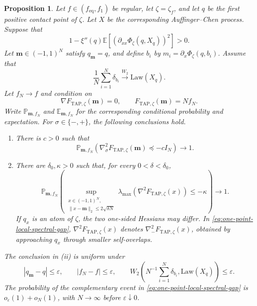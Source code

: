 \documentclass[a4paper,10pt,reqno]{amsart}
\numberwithin{equation}{section}
\newtheorem{proposition}{Proposition}[section]
\newcommand{\ve}{\varepsilon}
\newcommand{\dP}{\mathbb{P}}%
\newcommand{\dE}{\mathbb{E}}%
\newcommand{\Law}{\mathrm{Law}}
\newcommand{\TAP}{\mathrm{TAP}}
\newcommand{\eq}{\mathrm{eq}}
\newcommand{\bfm}{\mathbf{m}}
\begin{document}
	\begin{proposition}\label{prop:one-point-conditional-hessian}
		Let \(f\in(f_{\eq},f_1)\) be regular, let \(\zeta=\zeta_f\), and let
		\(q\) be the first positive contact point of \(\zeta\). Let \(X\) be the
		corresponding Auffinger--Chen process. Suppose that
		\[
		1-\xi''(q)\dE\left[
		\left(
		\partial_{xx}\Phi_\zeta(q,X_q)
		\right)^2
		\right]>0.
		\]
		Let \(\bfm\in (-1,1)^N\) satisfy \(q_\bfm=q\), and define \(b_i\) by
		\(m_i=\partial_x\Phi_\zeta(q,b_i)\). Assume that
		\[
		\frac1N\sum_{i=1}^N\delta_{b_i}
		\xrightarrow{W_2}\Law(X_q).
		\]
		Let \(f_N\to f\) and condition on
		\[
		\nabla F_{\TAP,\zeta}(\bfm)=0,
		\qquad
		F_{\TAP,\zeta}(\bfm)=Nf_N.
		\]
		Write \(\dP_{\bfm,f_N}\) and \(\dE_{\bfm,f_N}\) for the corresponding
		conditional probability and expectation. For
		\(\sigma\in\{-,+\}\), the following conclusions hold.
		\begin{enumerate}[label=\textup{(\roman*)}]
			\item There is \(c>0\) such that
			\begin{equation}
				\dP_{\bfm,f_N}\left(
				\nabla_\sigma^2F_{\TAP,\zeta}(\bfm)\preceq-cI_N
				\right)\longrightarrow1.
			\end{equation}
			
			\item
			\begingroup
			There are \(\delta_0,\kappa>0\) such that, for every
			\(0<\delta<\delta_0\),
			\begin{equation}\label{eq:one-point-local-spectral-gap}
				\dP_{\bfm,f_N}\left(
				\sup_{\substack{
						x\in(-1,1)^N,\\
						\|x-\bfm\|_2\le2\sqrt{\delta N}
				}}
				\lambda_{\max}\!\left(
				\nabla^2F_{\TAP,\zeta}(x)
				\right)
				\le-\kappa
				\right)\longrightarrow1.
			\end{equation}
			If \(q_x\) is an atom of \(\zeta\), the two one-sided Hessians may
			differ. In \eqref{eq:one-point-local-spectral-gap},
			\(\nabla^2F_{\TAP,\zeta}(x)\) denotes
			\(\nabla_-^2F_{\TAP,\zeta}(x)\), obtained by approaching \(q_x\)
			through smaller self-overlaps.
			\endgroup
		\end{enumerate}
		The conclusion in \textup{(ii)} is uniform under
		\[
		|q_\bfm-q|\le\ve,
		\qquad
		|f_N-f|\le\ve,
		\qquad
		W_2\left(N^{-1}\sum_{i=1}^N\delta_{b_i},\Law(X_q)\right)\le\ve.
		\]
		The probability of the complementary event in
		\eqref{eq:one-point-local-spectral-gap} is
		\(o_\ve(1)+o_N(1)\), with \(N\to\infty\) before \(\ve\downarrow0\).
	\end{proposition}
	
\end{document}
